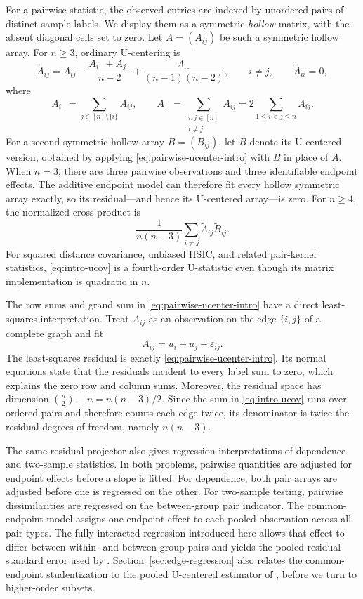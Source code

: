 \documentclass[11pt]{article}
\theoremstyle{plain}
\theoremstyle{definition}
\theoremstyle{remark}
\begin{document}
For a pairwise statistic, the observed entries are indexed by unordered pairs
of distinct sample labels.  We display them as a symmetric \emph{hollow}
matrix, with the absent diagonal cells set to zero.  Let $A=(A_{ij})$ be such
a symmetric hollow array. For $n\ge3$, ordinary U-centering is
\begin{equation}\label{eq:pairwise-ucenter-intro}
 \widetilde A_{ij}
 =A_{ij}
 -\frac{A_{i\cdot}+A_{j\cdot}}{n-2}
 +\frac{A_{\cdot\cdot}}{(n-1)(n-2)},
 \qquad i\ne j,
 \qquad
 \widetilde A_{ii}=0,
\end{equation}
where
\[
 A_{i\cdot}=\sum_{j\in[n]\setminus\{i\}}A_{ij},
 \qquad
 A_{\cdot\cdot}
 =\sum_{\substack{i,j\in[n]\\i\ne j}}A_{ij}
 =2\sum_{1\le i<j\le n}A_{ij}.
\]
For a second symmetric hollow array $B=(B_{ij})$, let $\widetilde B$ denote
its U-centered version, obtained by applying
\eqref{eq:pairwise-ucenter-intro} with $B$ in place of $A$.  When $n=3$, there
are three pairwise observations and three identifiable
endpoint effects.  The additive endpoint model can therefore fit every hollow
symmetric array exactly, so its residual---and hence its U-centered
array---is zero.  For $n\ge4$, the normalized cross-product is
\begin{equation}\label{eq:intro-ucov}
 \frac{1}{n(n-3)}
 \sum_{i\ne j}\widetilde A_{ij}\widetilde B_{ij}.
\end{equation}
For squared distance covariance, unbiased HSIC, and related pair-kernel
statistics, \eqref{eq:intro-ucov} is a fourth-order U-statistic even though
its matrix implementation is quadratic in $n$.

The row sums and grand sum in \eqref{eq:pairwise-ucenter-intro} have a direct
least-squares interpretation.  Treat $A_{ij}$ as an observation on the edge
$\{i,j\}$ of a complete graph and fit
\[
 A_{ij}=u_i+u_j+\varepsilon_{ij}.
\]
The least-squares residual is exactly \eqref{eq:pairwise-ucenter-intro}.  Its
normal equations state that the residuals incident to every label sum to zero,
which explains the zero row and column sums.  Moreover, the residual space has
dimension $\binom n2-n=n(n-3)/2$.  Since the sum in
\eqref{eq:intro-ucov} runs over ordered pairs and therefore counts each edge
twice, its denominator is twice the residual degrees of freedom, namely
$n(n-3)$.

The same residual projector also gives regression interpretations
of dependence and two-sample statistics.  In both problems, pairwise
quantities are adjusted for endpoint effects before a slope is fitted.  For
dependence, both pair arrays are adjusted before one is regressed on the
other.  For two-sample testing, pairwise dissimilarities are regressed on the
between-group pair indicator.  The common-endpoint model assigns one endpoint
effect to each pooled observation across all pair types.  The fully interacted
regression introduced here allows that effect to differ between within- and
between-group pairs and yields the pooled residual standard error used by
\citet{ChakrabortyZhang2021}.  Section~\ref{sec:edge-regression} also relates
the common-endpoint studentization to the pooled U-centered estimator of
\citet{GaoShao2023}, before we turn to higher-order subsets.
\end{document}
